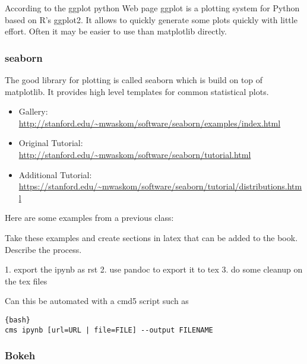 

According to the ggplot python Web page ggplot is a plotting system for
Python based on R's ggplot2. It allows to quickly generate some plots
quickly with little effort. Often it may be easier to use than
matplotlib directly.

\subsubsection{seaborn}\label{seaborn}


The good library for plotting is called seaborn which is build on top of
matplotlib. It provides high level templates for common statistical
plots.

\begin{itemize}
\item
  Gallery:
  \url{http://stanford.edu/~mwaskom/software/seaborn/examples/index.html}
\item
  Original Tutorial:
  \url{http://stanford.edu/~mwaskom/software/seaborn/tutorial.html}
\item
  Additional Tutorial:
  \url{https://stanford.edu/~mwaskom/software/seaborn/tutorial/distributions.html}
\end{itemize}

Here are some examples from a previous class:


\begin{exercise}\label{E:ipynb-export}
Take these examples and create sections in latex that can be added to
the book. Describe the process. 

1. export the ipynb as rst
2. use pandoc to export it to tex
3. do some cleanup on the tex files

Can this be automated with a cmd5 script such as
\begin{lstlisting}{bash}
cms ipynb [url=URL | file=FILE] --output FILENAME
\end{lstlisting}
\end{exercise}

\subsubsection{Bokeh}\label{bokeh}

